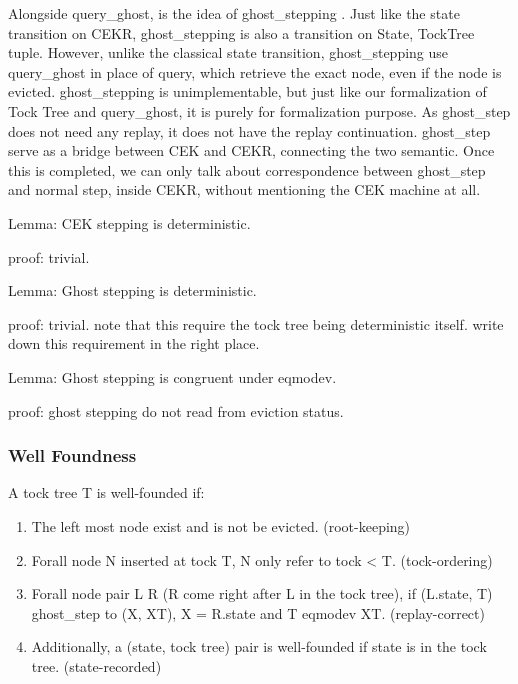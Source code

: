 Alongside query\_ghost, is the idea of ghost\_stepping . Just like the state transition on CEKR, ghost\_stepping is also a transition on State, TockTree tuple. However, unlike the classical state transition, ghost\_stepping use query\_ghost in place of query, which retrieve the exact node, even if the node is evicted. ghost\_stepping is unimplementable, but just like our formalization of Tock Tree and query\_ghost, it is purely for formalization purpose. As ghost\_step does not need any replay, it does not have the replay continuation. ghost\_step serve as a bridge between CEK and CEKR, connecting the two semantic. Once this is completed, we can only talk about correspondence between ghost\_step and normal step, inside CEKR, without mentioning the CEK machine at all.

Lemma: CEK stepping is deterministic.

proof: trivial.

Lemma: Ghost stepping is deterministic.

proof: trivial. note that this require the tock tree being deterministic itself. write down this requirement in the right place.

Lemma: Ghost stepping is congruent under eqmodev.

proof: ghost stepping do not read from eviction status.

\subsubsection{Well Foundness}
A tock tree T is well-founded  if:
\begin{enumerate}
	\item The left most node exist and is not be evicted. (root-keeping)
	\item Forall node N inserted at tock T, N only refer to tock < T. (tock-ordering)
	\item Forall node pair L R (R come right after L in the tock tree), if (L.state, T) ghost\_step to (X, XT), X = R.state and T eqmodev XT. (replay-correct)
	\item Additionally, a (state, tock tree) pair is well-founded if state is in the tock tree. (state-recorded)
\end{enumerate}

